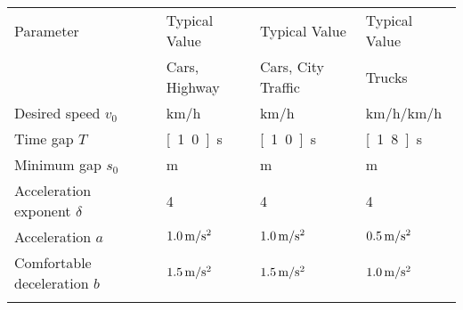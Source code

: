 \documentclass[11pt,a4paper]{scrreprt}
\begin{document}
\begin{itemize}

{\small
\centering
\begin{tabular}{p{}p{}p{}p{}}
\hline\noalign{\smallskip}
Parameter & Typical Value & Typical Value & Typical Value \\
 & Cars, Highway & Cars, City Traffic & Trucks \\
\noalign{\smallskip}\hline\noalign{\smallskip}
Desired speed $v_0$ & \unit[120]{km/h} & \unit[54]{km/h} & \unit[50]{km/h}/\unit[80]{km/h} \\
Time gap $T$ & \unit[1.0]{s} & \unit[1.0]{s} & \unit[1.8]{s} \\
Minimum gap $s_0$ & \unit[2]{m} & \unit[2]{m} & \unit[3]{m} \\
Acceleration exponent $\delta$ & 4 & 4 & 4 \\
Acceleration $a$ & $\unit[1.0]{m/s^2}$ & $\unit[1.0]{m/s^2}$ & $\unit[0.5]{m/s^2}$ \\
Comfortable deceleration $b$ & $\unit[1.5]{m/s^2}$ & $\unit[1.5]{m/s^2}$ & $\unit[1.0]{m/s^2}$ \\
\noalign{\smallskip}\hline\noalign{\smallskip}
\end{tabular}
}

\end{itemize}
\end{document}
